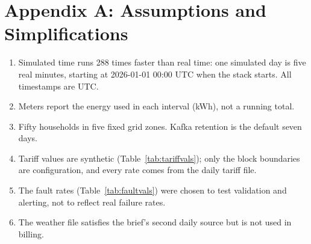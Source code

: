 \documentclass[11pt,a4paper]{article}
\begin{document}
\section*{Appendix A: Assumptions and Simplifications}

\begin{enumerate}
  \item Simulated time runs 288 times faster than real time: one simulated day is five real
        minutes, starting at 2026-01-01 00:00 UTC when the stack starts. All timestamps are UTC.
  \item Meters report the energy used in each interval (kWh), not a running total.
  \item Fifty households in five fixed grid zones. Kafka retention is the default seven days.
  \item Tariff values are synthetic (Table~\ref{tab:tariffvals}); only the block boundaries
        are configuration, and every rate comes from the daily tariff file.
  \item The fault rates (Table~\ref{tab:faultvals}) were chosen to test validation and
        alerting, not to reflect real failure rates.
  \item The weather file satisfies the brief's second daily source but is not used in billing.
\end{enumerate}
\end{document}

